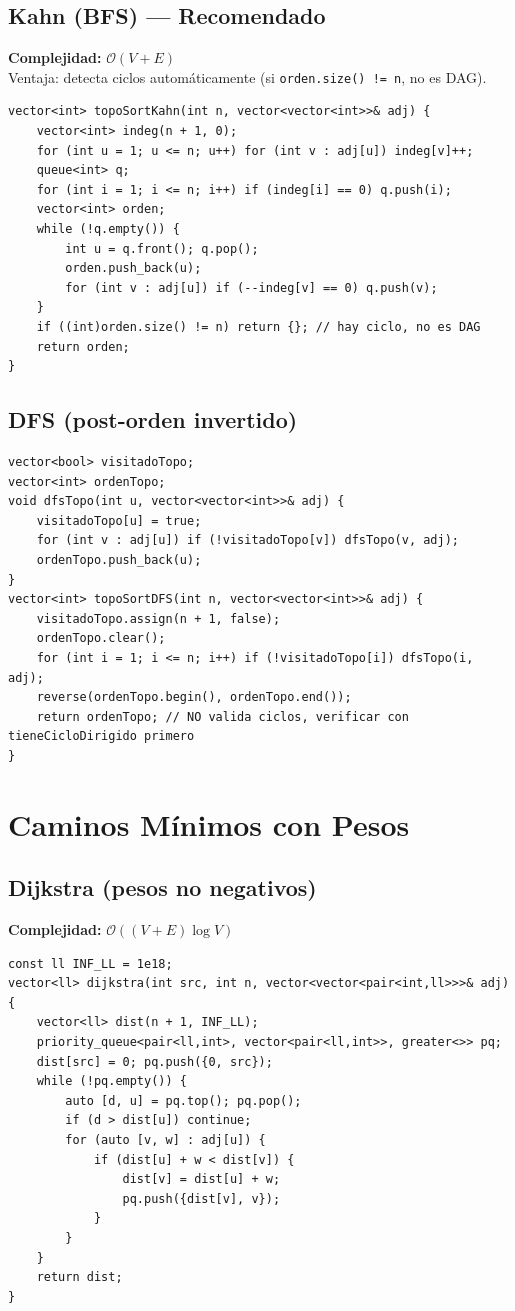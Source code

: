 \documentclass[10pt,twocolumn,letterpaper]{report}
\begin{document}
\subsection{Kahn (BFS) --- Recomendado}
\textbf{Complejidad:} $\mathcal{O}(V + E)$ \\
Ventaja: detecta ciclos automáticamente (si \texttt{orden.size() != n}, no es DAG).
\begin{lstlisting}
vector<int> topoSortKahn(int n, vector<vector<int>>& adj) {
    vector<int> indeg(n + 1, 0);
    for (int u = 1; u <= n; u++) for (int v : adj[u]) indeg[v]++;
    queue<int> q;
    for (int i = 1; i <= n; i++) if (indeg[i] == 0) q.push(i);
    vector<int> orden;
    while (!q.empty()) {
        int u = q.front(); q.pop();
        orden.push_back(u);
        for (int v : adj[u]) if (--indeg[v] == 0) q.push(v);
    }
    if ((int)orden.size() != n) return {}; // hay ciclo, no es DAG
    return orden;
}
\end{lstlisting}

\subsection{DFS (post-orden invertido)}
\begin{lstlisting}
vector<bool> visitadoTopo;
vector<int> ordenTopo;
void dfsTopo(int u, vector<vector<int>>& adj) {
    visitadoTopo[u] = true;
    for (int v : adj[u]) if (!visitadoTopo[v]) dfsTopo(v, adj);
    ordenTopo.push_back(u);
}
vector<int> topoSortDFS(int n, vector<vector<int>>& adj) {
    visitadoTopo.assign(n + 1, false);
    ordenTopo.clear();
    for (int i = 1; i <= n; i++) if (!visitadoTopo[i]) dfsTopo(i, adj);
    reverse(ordenTopo.begin(), ordenTopo.end());
    return ordenTopo; // NO valida ciclos, verificar con tieneCicloDirigido primero
}
\end{lstlisting}

\section{Caminos Mínimos con Pesos}

\subsection{Dijkstra (pesos no negativos)}
\textbf{Complejidad:} $\mathcal{O}((V + E) \log V)$
\begin{lstlisting}
const ll INF_LL = 1e18;
vector<ll> dijkstra(int src, int n, vector<vector<pair<int,ll>>>& adj) {
    vector<ll> dist(n + 1, INF_LL);
    priority_queue<pair<ll,int>, vector<pair<ll,int>>, greater<>> pq;
    dist[src] = 0; pq.push({0, src});
    while (!pq.empty()) {
        auto [d, u] = pq.top(); pq.pop();
        if (d > dist[u]) continue;
        for (auto [v, w] : adj[u]) {
            if (dist[u] + w < dist[v]) {
                dist[v] = dist[u] + w;
                pq.push({dist[v], v});
            }
        }
    }
    return dist;
}
\end{lstlisting}
\end{document}
